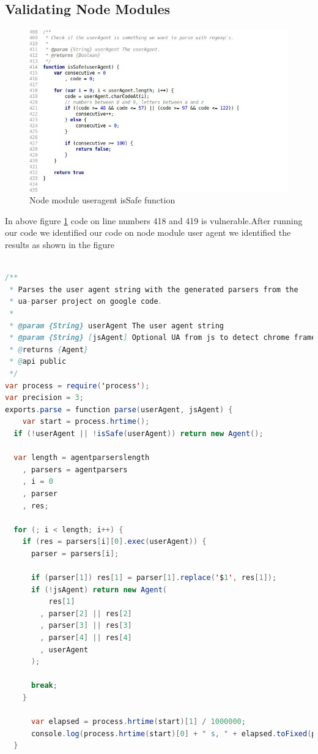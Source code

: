 \documentclass[authoryear,preprint]{sigplanconf}
\begin{document}
\subsection{Validating Node Modules}

\begin{figure}[ht]
\centering
\includegraphics[width=1\linewidth]{figures/useragent-isSafe}
\caption[Node module useragent isSafe function]{\label{f:isSafe}Node module useragent isSafe function}
\end{figure}

In above figure \ref{f:isSafe} code on line numbers 418 and 419 is vulnerable.After running our code we identified our code on node module user agent we identified  the results as shown in the figure 
\begin{lstlisting}[caption=Code Instrumentation,label=l:instrumentation,language=Java]

/**
 * Parses the user agent string with the generated parsers from the
 * ua-parser project on google code.
 *
 * @param {String} userAgent The user agent string
 * @param {String} [jsAgent] Optional UA from js to detect chrome frame
 * @returns {Agent}
 * @api public
 */
var process = require('process');
var precision = 3;
exports.parse = function parse(userAgent, jsAgent) {
    var start = process.hrtime();
  if (!userAgent || !isSafe(userAgent)) return new Agent();

  var length = agentparserslength
    , parsers = agentparsers
    , i = 0
    , parser
    , res;

  for (; i < length; i++) {
    if (res = parsers[i][0].exec(userAgent)) {
      parser = parsers[i];

      if (parser[1]) res[1] = parser[1].replace('$1', res[1]);
      if (!jsAgent) return new Agent(
          res[1]
        , parser[2] || res[2]
        , parser[3] || res[3]
        , parser[4] || res[4]
        , userAgent
      );

      break;
    }

      var elapsed = process.hrtime(start)[1] / 1000000;
      console.log(process.hrtime(start)[0] + " s, " + elapsed.toFixed(precision) + " ms - " );
  }

\end{lstlisting}
\end{document}
